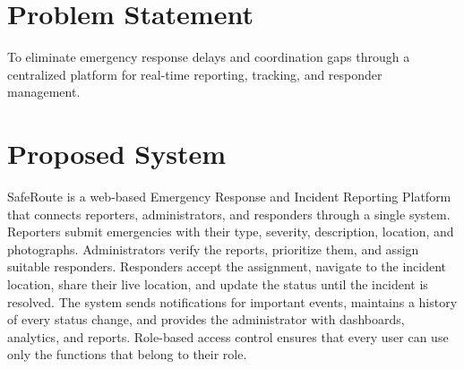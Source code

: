 \documentclass[a4paper,12pt]{report}
\begin{document}
	\section{Problem Statement}
	\par To eliminate emergency response delays and coordination gaps through a centralized platform for real-time reporting, tracking, and responder management.
	
	\section{Proposed System}
	\par SafeRoute is a web-based Emergency Response and Incident Reporting Platform that connects reporters, administrators, and responders through a single system. Reporters submit emergencies with their type, severity, description, location, and photographs. Administrators verify the reports, prioritize them, and assign suitable responders. Responders accept the assignment, navigate to the incident location, share their live location, and update the status until the incident is resolved. The system sends notifications for important events, maintains a history of every status change, and provides the administrator with dashboards, analytics, and reports. Role-based access control ensures that every user can use only the functions that belong to their role.
	
\end{document}
